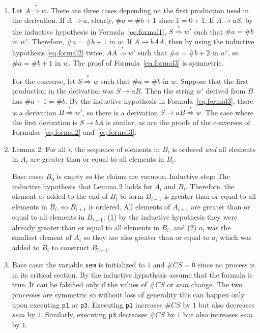 \documentclass[11pt,a4paper]{report}
\begin{document}
\begin{enumerate}
\item Let $A\stackrel{*}{\Rightarrow} w$. There are three cases depending on the first production used in the derivation. If $A \rightarrow a$, clearly, $\#a=\#b+1$ since $1=0+1$. If $A\rightarrow aS$, by the inductive hypothesis in Formula~\ref{eq.formal1}, $S\stackrel{*}{\Rightarrow} w'$ such that $\#a=\#b$ in $w'$. Therefore, $\#a=\#b+1$ in $w$. If $A\rightarrow bAA$, then by using the inductive hypothesis \ref{eq.formal2} twice, $AA\stackrel{*}{\Rightarrow} w'$ such that $\#a=\#b+2$ in $w'$, so $\#a=\#b+1$ in $w$. The proof of Formula~\ref{eq.formal3} is symmetric.

For the converse, let $S\stackrel{*}{\Rightarrow} w$ such that $\#a=\#b$ in $w$. Suppose that the first production in the derivation was $S\rightarrow aB$. Then the string $w'$ derived from $B$ has $\#a+1=\#b$. By the inductive hypothesis in Formula~\ref{eq.formal3}, there is a derivation $B\stackrel{*}{\Rightarrow} w'$, so there is a derivation $S \rightarrow aB \stackrel{*}{\Rightarrow} w$. The case where the first derivation is $S\rightarrow bA$ is similar, as are the proofs of the converses of Formulas~\ref{eq.formal2} and~\ref{eq.formal3}.


\item Lemma 2: For all $i$, the sequence of elements in $B_i$ is ordered \emph{and} all elements in $A_i$ are greater than or equal to all elements in $B_i$.

Base case: $B_0$ is empty so the claims are vacuous. Inductive step: The inductive hypothesis that Lemma 2 holds for $A_i$ and $B_i$. Therefore, the element $a_i$ added to the end of $B_i$ to form $B_{i+1}$ is greater than or equal to all elements in $B_i$, so $B_{i+1}$ is ordered. All elements of $A_{i+1}$ are greater than or equal to all elements in $B_{i+1}$: (1) by the inductive hypothesis they were already greater than or equal to all elements in $B_i$, and (2) $a_i$ was the smallest element of $A_i$ so they are also greater than or equal to $a_i$ which was added to $B_i$ to construct $B_{i+1}$.

\item Base case: the variable \texttt{sem} is initialized to $1$ and $\#\mathit{CS}=0$ since no process is in its critical section. By the inductive hypothesis assume that the formula is true. It can be falsified only if the values of $\#\mathit{CS}$ or $\mathit{sem}$ change. The two processes are symmetric so without loss of generality this can happen only upon executing \texttt{p1} or \texttt{p3}. Executing \texttt{p1} increases $\#\mathit{CS}$ by $1$ but also decreases $\mathit{sem}$ by $1$. Similarly, executing \texttt{p3} decreases $\#\mathit{CS}$ by $1$ but also increases $\mathit{sem}$ by $1$. 


\end{enumerate}
\end{document}
